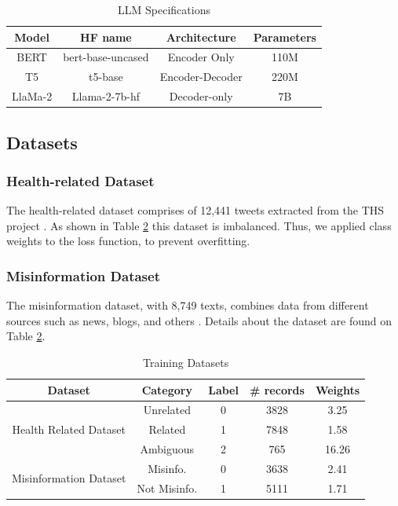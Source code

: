   \begin{table}[htbp]
\centering
\caption{LLM Specifications}
{
\begin{tabular}{||c | c | c | c||} 
 \hline
\textbf{Model} & \textbf{HF name} & \textbf{Architecture} & \textbf{Parameters} \\
 \hline
 BERT & bert-base-uncased & Encoder Only & 110M \\ 
 \hline
 T5 & t5-base & Encoder-Decoder & 220M \\
 \hline
 LlaMa-2 & Llama-2-7b-hf & Decoder-only & 7B \\
 \hline
\end{tabular}
}
\label{table:LLM}
\end{table}

\subsection{Datasets}

\subsubsection{Health-related Dataset}
The health-related dataset comprises of 12,441 tweets extracted from the THS project \cite{8622504}. As shown in Table \ref{table:dataset} this dataset is imbalanced. Thus, we applied class weights to the loss function, to prevent overfitting.

\subsubsection{Misinformation Dataset}
The misinformation dataset, with 8,749 texts, combines data from different sources such as news, blogs, and others \cite{stephencrone2022,coviddata,covidunesco}. 
Details about the dataset are found on Table \ref{table:dataset}.

\begin{table}[htbp]
	\centering
	\caption{Training Datasets}
	{
	\begin{tabular}{||c | c | c | c | c||} 
		\hline
		\textbf{Dataset} &
		\textbf{Category} & \textbf{Label} & \textbf{\# records} & \textbf{Weights} \\
		\hline
		\multirow{3}{6.1em}{Health Related Dataset} & Unrelated & 0 & 3828 & 3.25  \\
		& Related & 1 & 7848 & 1.58  \\ 
		& Ambiguous & 2 & 765 & 16.26 \\
		\hline
		\multirow{2}{6.1em}{Misinformation Dataset} & Misinfo. & 0 & 3638 & 2.41\\ 
		& Not Misinfo. & 1 & 5111 & 1.71 \\
		\hline
	\end{tabular}
	}
	\label{table:dataset}
\end{table}

